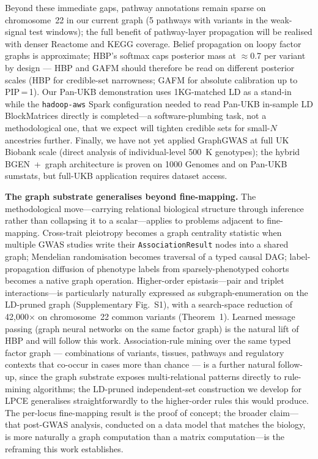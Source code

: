 Beyond these immediate gaps, pathway annotations remain sparse on
chromosome~22 in our current graph (5 pathways with variants in
the weak-signal test windows); the full benefit of pathway-layer
propagation will be realised with denser Reactome\cite{gillespie2022reactome}
and KEGG\cite{kanehisa2023kegg} coverage. Belief propagation on loopy factor graphs is
approximate; HBP's softmax caps posterior mass at $\approx$0.7
per variant by design --- HBP and GAFM should therefore be read on
different posterior scales (HBP for credible-set narrowness; GAFM
for absolute calibration up to PIP\,=\,1). Our Pan-UKB demonstration uses
1KG-matched LD as a stand-in while the \texttt{hadoop-aws} Spark
configuration needed to read Pan-UKB in-sample LD BlockMatrices
directly is completed---a software-plumbing task, not a
methodological one, that we expect will tighten credible sets
for small-$N$ ancestries further. Finally, we have not yet
applied GraphGWAS at full UK Biobank scale (direct analysis of
individual-level 500~K genotypes); the hybrid BGEN~+~graph
architecture is proven on 1000 Genomes and on Pan-UKB sumstats,
but full-UKB application requires dataset access.

\textbf{The graph substrate generalises beyond fine-mapping.}
The methodological move---carrying relational biological
structure through inference rather than collapsing it to a
scalar---applies to problems adjacent to
fine-mapping\cite{ulirsch2021fine,schaid2018genome}. Cross-trait
pleiotropy becomes a graph centrality statistic when multiple
GWAS studies write their \texttt{AssociationResult} nodes into a
shared graph; Mendelian randomisation becomes traversal of a
typed causal DAG; label-propagation diffusion of phenotype
labels from sparsely-phenotyped cohorts becomes a native graph
operation. Higher-order epistasis---pair and triplet
interactions---is particularly naturally expressed as
subgraph-enumeration on the LD-pruned graph
(Supplementary Fig.~S1), with a search-space reduction of
42{,}000$\times$ on chromosome~22 common variants (Theorem~1).
Learned message passing (graph neural networks on the same
factor graph) is the natural lift of HBP and will follow this
work. Association-rule mining over the same typed factor graph ---
combinations of variants, tissues, pathways and regulatory contexts
that co-occur in cases more than chance --- is a further natural
follow-up, since the graph substrate exposes multi-relational
patterns directly to rule-mining algorithms; the LD-pruned
independent-set construction we develop for LPCE generalises
straightforwardly to the higher-order rules this would produce.
The per-locus fine-mapping result is the proof of
concept; the broader claim---that post-GWAS analysis, conducted
on a data model that matches the biology, is more naturally a
graph computation than a matrix computation---is the reframing
this work establishes.
